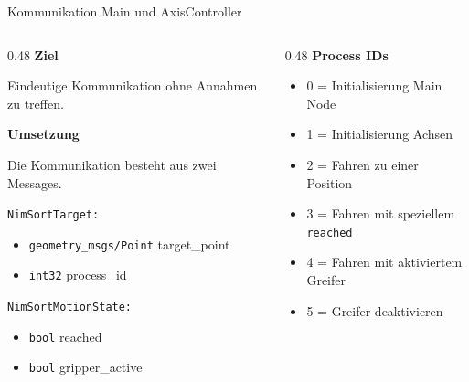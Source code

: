 \documentclass[aspectratio=169]{beamer}
\begin{document}
\begin{frame}{Kommunikation Main und AxisController}
    \begin{columns}
        \begin{column}{0.48\textwidth}
            \textbf{Ziel}

            Eindeutige Kommunikation ohne Annahmen zu treffen.
            \vspace{0.5em}

            \textbf{Umsetzung}

            Die Kommunikation besteht aus zwei Messages.
            \vspace{0.3em}

            \texttt{NimSortTarget:}
            \begin{itemize}
                \item \texttt{geometry\_msgs/Point} target\_point
                \item \texttt{int32} process\_id
            \end{itemize}
            \vspace{0.3em}

            \texttt{NimSortMotionState:}
            \begin{itemize}
                \item \texttt{bool} reached
                \item \texttt{bool} gripper\_active
            \end{itemize}
        \end{column}
        \begin{column}{0.48\textwidth}
            \textbf{Process IDs}
            \begin{itemize}
                \item 0 = Initialisierung Main Node
                \item 1 = Initialisierung Achsen
                \item 2 = Fahren zu einer Position
                \item 3 = Fahren mit speziellem \texttt{reached}
                \item 4 = Fahren mit aktiviertem Greifer
                \item 5 = Greifer deaktivieren
            \end{itemize}
        \end{column}
    \end{columns}
\end{frame}
\end{document}
